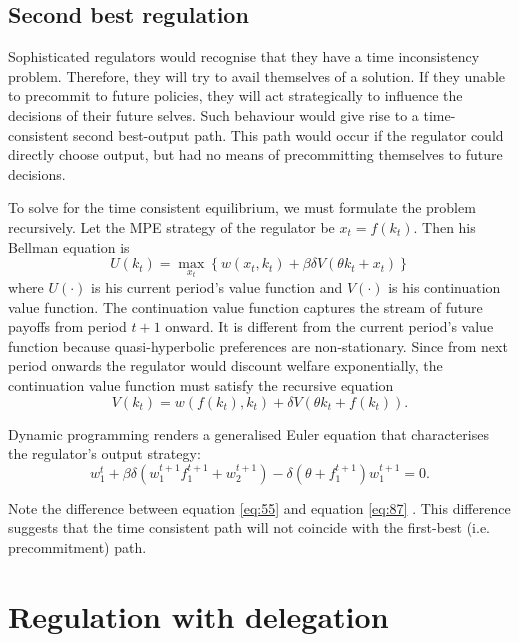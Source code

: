 \subsection{Second best regulation}

\label{sec:second-best-regul}

Sophisticated regulators would recognise that they have a time inconsistency
problem. Therefore, they will try to avail themselves of a solution. If they
unable to precommit to future policies, they will act strategically to
influence the decisions of their future selves. Such behaviour would give
rise to a time-consistent second best-output path. This path would occur if
the regulator could directly choose output, but had no means of
precommitting themselves to future decisions.

To solve for the time consistent equilibrium, we must formulate the problem
recursively. Let the MPE strategy of the regulator be $x_{t}=f(k_{t})$. Then
his Bellman equation is 
\begin{equation}
U(k_{t})=\max_{x_{t}}\left\{ w(x_{t},k_{t})+\beta \delta V(\theta
k_{t}+x_{t})\right\}   \label{eq:51}
\end{equation}%
where $U(\cdot )$ is his current period's value function and $V(\cdot )$ is
his continuation value function. The continuation value function captures
the stream of future payoffs from period $t+1$ onward. It is different from
the current period's value function because quasi-hyperbolic preferences are
non-stationary. Since from next period onwards the regulator would discount
welfare exponentially, the continuation value function must satisfy the
recursive equation 
\begin{equation}
V(k_{t})=w\left( f(k_{t}),k_{t}\right) +\delta V\left( \theta
k_{t}+f(k_{t})\right) .  \label{eq:52}
\end{equation}

Dynamic programming renders a generalised Euler equation that characterises
the regulator's output strategy: 
\begin{equation}
w_{1}^{t}+\beta \delta (w_{1}^{t+1}f_{1}^{t+1}+w_{2}^{t+1})-\delta (\theta
+f_{1}^{t+1})w_{1}^{t+1}=0.  \label{eq:55}
\end{equation}

Note the difference between equation \eqref{eq:55} and equation \eqref{eq:87}%
. This difference suggests that the time consistent path will not coincide
with the first-best (i.e. precommitment) path.

\section{Regulation with delegation}

